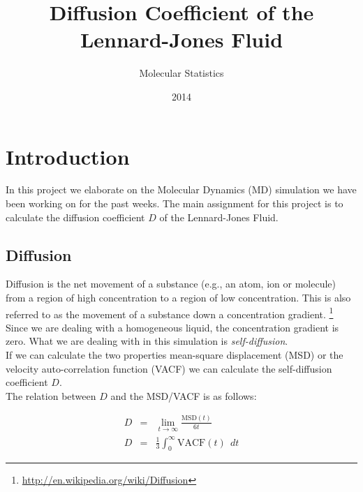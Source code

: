 \documentclass{article}
\title{Diffusion Coefficient of the Lennard-Jones Fluid}
\author{Molecular Statistics}
\date{2014}
\begin{document}


\maketitle

\section{Introduction}

In this project we elaborate on the Molecular Dynamics (MD)
simulation we have been working on for the past weeks.
The main assignment for this project is to calculate the
diffusion coefficient $D$ of the Lennard-Jones Fluid.\\




\subsection{Diffusion}

Diffusion is the net movement of a substance (e.g., an atom, ion or molecule) from a region of high concentration to a region of low concentration. This is also referred to as the movement of a substance down a concentration gradient. \footnote{\href{http://en.wikipedia.org/wiki/Diffusion}{http://en.wikipedia.org/wiki/Diffusion}}
Since we are dealing with a homogeneous liquid, the concentration gradient is zero.
What we are dealing with in this simulation is {\em self-diffusion}.\\

If we can calculate the two properties mean-square displacement (MSD) or the velocity auto-correlation function (VACF)
we can calculate the self-diffusion coefficient $D$.\\

The relation between $D$ and the MSD/VACF is as follows:

\begin{eqnarray}
    D &=& \lim_{t\rightarrow \infty} \frac{\mathrm{MSD}(t)}{6t}\\
    D &=& \frac{1}{3} \int_0^\infty \mathrm{VACF}(t) \ \ dt
\end{eqnarray}
\end{document}
